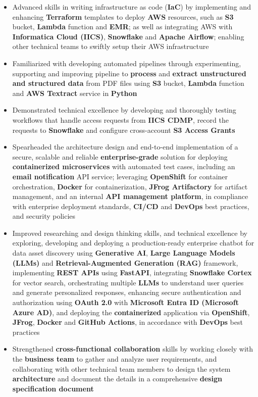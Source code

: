 \documentclass[12pt,letterpaper,sans]{moderncv}        %
\begin{document}
\begin{itemize}
  \item Advanced skills in writing infrastructure as code (\textbf{IaC}) by implementing and enhancing \textbf{Terraform} templates to deploy \textbf{AWS} resources, such as \textbf{S3} bucket, \textbf{Lambda} function and \textbf{EMR}; as well as integrating AWS with \textbf{Informatica Cloud (IICS)}, \textbf{Snowflake} and \textbf{Apache Airflow}; enabling other technical teams to swiftly setup their AWS infrastructure
  \item Familiarized with developing automated pipelines through experimenting, supporting and improving pipeline to \textbf{process} and \textbf{extract} \textbf{unstructured and structured data} from PDF files using \textbf{S3} bucket, \textbf{Lambda} function and \textbf{AWS Textract} service in \textbf{Python}
  \item Demonstrated technical excellence by developing and thoroughly testing workflows that handle access requests from \textbf{IICS CDMP}, record the requests to \textbf{Snowflake} and configure cross-account \textbf{S3 Access Grants}
  \item Spearheaded the architecture design and end-to-end implementation of a secure, scalable and reliable \textbf{enterprise-grade} solution for deploying \textbf{containerized microservices} with automated test cases, including an \textbf{email notification} API service; leveraging \textbf{OpenShift} for container orchestration, \textbf{Docker} for containerization, \textbf{JFrog Artifactory} for artifact management, and an internal \textbf{API management platform}, in compliance with enterprise deployment standards, \textbf{CI/CD} and \textbf{DevOps} best practices, and security policies
  \item Improved researching and design thinking skills, and technical excellence by exploring, developing and deploying a production-ready enterprise chatbot for data asset discovery using \textbf{Generative AI}, \textbf{Large Language Models (LLMs)} and \textbf{Retrieval-Augmented Generation (RAG)} framework, implementing \textbf{REST APIs} using \textbf{FastAPI}, integrating \textbf{Snowflake Cortex} for vector search, orchestrating multiple \textbf{LLMs} to understand user queries and generate personalized responses, enhancing secure authentication and authorization using \textbf{OAuth 2.0} with \textbf{Microsoft Entra ID (Microsoft Azure AD)}, and deploying the \textbf{containerized} application via \textbf{OpenShift}, \textbf{JFrog}, \textbf{Docker} and \textbf{GitHub Actions}, in accordance with \textbf{DevOps} best practices
  \item Strengthened \textbf{cross-functional collaboration} skills by working closely with the \textbf{business team} to gather and analyze user requirements, and collaborating with other technical team members to design the system \textbf{architecture} and document the details in a comprehensive \textbf{design specification document}
\end{itemize}
\end{document}
